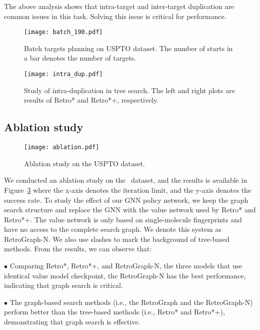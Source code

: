 \documentclass[sigconf]{acmart}
\begin{document}
The above analysis shows that intra-target and inter-target duplication are common issues in this task.
Solving this issue is critical for performance.

\begin{figure}[!tb]
    \centering
    \texttt{[image: batch\_190.pdf]}
    \caption{Batch targets planning on USPTO dataset. The number of starts in a bar denotes the number of targets.}
    \label{fig:batch_190}
\end{figure}

\begin{figure}[!htbp]
    \centering
    \texttt{[image: intra\_dup.pdf]}
\caption{Study of intra-duplication in tree search. The left and right plots are results of Retro* and Retro*+, respectively.}
    \label{fig:dup}
\end{figure}


\subsection{Ablation study}\label{sec:res_ablation}
\begin{figure}[!htbp]
    \centering
    \texttt{[image: ablation.pdf]}
    \caption{Ablation study on the USPTO dataset.}
    \label{fig:ablation}
\end{figure}

We conducted an ablation study on the \uspto~dataset, and the results is available in Figure~\ref{fig:ablation} where the x-axis denotes the iteration limit, and the y-axis denotes the success rate.
To study the effect of our GNN policy network, we keep the graph search structure and replace the GNN with the value network used by Retro* and Retro*+.
The value network is only based on single-molecule fingerprints and have no access to the complete search graph.
We denote this system as RetroGraph-N.
We also use slashes to mark the background of tree-based methods.
From the results, we can observe that:

\noindent$\bullet$ Comparing Retro*, Retro*+, and RetroGraph-N, the three models that use identical value model checkpoint, the RetroGraph-N has the best performance, indicating that graph search is critical. 

\noindent$\bullet$ The graph-based search methods (i.e., the RetroGraph and the RetroGraph-N) perform better than the tree-based methods (i.e., Retro* and  Retro*+), demonstrating that graph search is effective.
\end{document}
